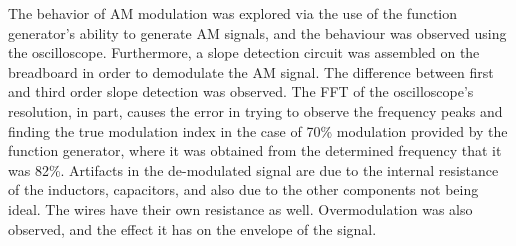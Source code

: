 The behavior of AM modulation was explored via the use of the function generator's ability to generate AM signals, and the behaviour was observed using the oscilloscope. Furthermore, a slope detection circuit was assembled on the breadboard in order to demodulate the AM signal. The difference between first and third order slope detection was observed. The FFT of the oscilloscope's resolution, in part, causes the error in trying to observe the frequency peaks and finding the true modulation index in the case of 70\% modulation provided by the function generator, where it was obtained from the determined frequency that it was 82\%. Artifacts in the de-modulated signal are due to the internal resistance of the inductors, capacitors, and also due to the other components not being ideal. The wires have their own resistance as well. Overmodulation was also observed, and the effect it has on the envelope of the signal.
